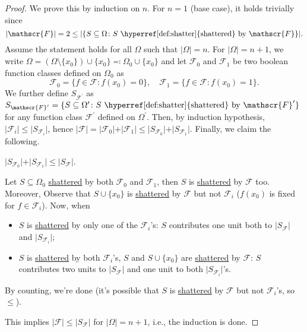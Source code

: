 \begin{proof}
	We prove this by induction on \(n\). For \(n = 1\) (base case), it holds trivially since
	\[
		\vert \mathscr{F} \vert = 2 \leq \vert \{ S \subseteq \Omega \colon S \text{ \hyperref[def:shatter]{shattered} by } \mathscr{F} \} \vert.
	\]
	Assume the statement holds for all \(\Omega \) such that \(\vert \Omega \vert = n\). For \(\vert \Omega \vert = n+1\), we write \(\Omega = (\Omega \setminus \{ x_0 \} ) \cup \{ x_0 \} \eqqcolon \Omega _0 \cup \{ x_0 \}\) and let \(\mathscr{F} _0\) and \(\mathscr{F} _1\) be two boolean function classes defined on \(\Omega _0\) as
	\[
		\mathscr{F} _0 = \{ f\in \mathscr{F} \colon f(x_0) = 0\} ,\quad
		\mathscr{F} _1 = \{ f\in \mathscr{F} \colon f(x_0) = 1\} .
	\]
	We further define \(S_{\mathscr{F} ^{\prime} }\) as \(S_{\mathscr{F} ^{\prime} } = \{ S \subseteq \Omega ^{\prime} \colon S \text{ \hyperref[def:shatter]{shattered} by } \mathscr{F} ^{\prime} \}\) for any function class \(\mathscr{F} ^{\prime} \) defined on \(\Omega ^{\prime} \). Then, by induction hypothesis, \(\vert \mathscr{F} _i \vert \leq \vert S_{\mathscr{F} _i} \vert \), hence \(\vert \mathscr{F} \vert = \vert \mathscr{F} _0 \vert + \vert \mathscr{F} _1 \vert \leq \vert S_{\mathscr{F} _0} \vert + \vert S_{\mathscr{F} _1} \vert\). Finally, we claim the following.

	\begin{claim}
		\(\vert S_{\mathscr{F} _0} \vert + \vert S_{\mathscr{F} _1} \vert \leq \vert S _{\mathscr{F} } \vert\).
	\end{claim}
	\begin{explanation}
		Let \(S \subseteq \Omega _0\) \hyperref[def:shatter]{shattered} by both \(\mathscr{F} _0\) and \(\mathscr{F} _1\), then \(S\) is \hyperref[def:shatter]{shattered} by \(\mathscr{F} \) too. Moreover, Observe that \(S \cup \{ x_0 \} \) is \hyperref[def:shatter]{shattered} by \(\mathscr{F} \) but not \(\mathscr{F} _i\) (\(f(x_0)\) is fixed for \(f\in \mathscr{F} _i\)). Now, when
		\begin{itemize}
			\item \(S\) is \hyperref[def:shatter]{shattered} by only one of the \(\mathscr{F} _i\)'s: \(S\) contributes one unit both to \(\vert S_{\mathscr{F} } \vert \) and \(\vert S_{\mathscr{F} _i} \vert \);
			\item \(S\) is \hyperref[def:shatter]{shattered} by both \(\mathscr{F} _i\)'s, \(S\) and \(S \cup \{ x_0 \} \) are \hyperref[def:shatter]{shattered} by \(\mathscr{F} \): \(S\) contributes two units to \(\vert S_{\mathscr{F} } \vert \) and one unit to both \(\vert S_{\mathscr{F} _i} \vert \)'s.
		\end{itemize}
		By counting, we're done (it's possible that \(S\) is \hyperref[def:shatter]{shattered} by \(\mathscr{F} \) but not \(\mathscr{F} _i\)'s, so \(\leq \)).
	\end{explanation}

	This implies \(\vert \mathscr{F} \vert \leq \vert S_{\mathscr{F} } \vert \) for \(\vert \Omega \vert = n+1\), i.e., the induction is done.
\end{proof}

